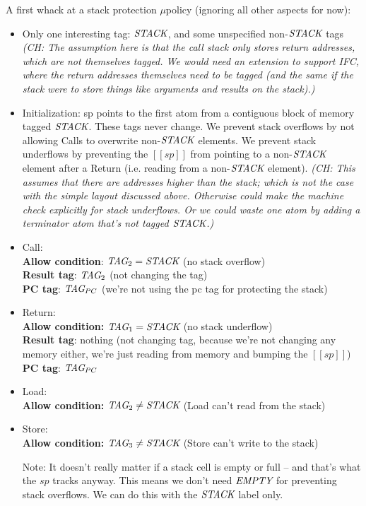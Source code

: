 \documentclass{article}
\newcommand{\ch}[1]{{\color{dkblue}\em (CH: #1)}}
\newcommand{\micro}{$\mu$}
\newcommand{\uP}{\micro policy\xspace}
\begin{document}
A first whack at a stack protection \uP
(ignoring all other aspects for now):
\begin{itemize}
\item Only one interesting tag: $\textit{STACK}$,
  and some unspecified non-$\textit{STACK}$ tags
  \ch{The assumption here is that the call stack only stores return
    addresses, which are not themselves tagged. We would need an
    extension to support IFC, where the return addresses themselves
    need to be tagged (and the same if the stack were to store things
    like arguments and results on the stack).}
\item Initialization: sp points to the first atom from a contiguous
  block of memory tagged $\textit{STACK}$.
  These tags never change. We prevent stack overflows by not
  allowing Calls to overwrite non-$\textit{STACK}$ elements. We prevent stack
  underflows by preventing the $[[sp]]$ from pointing to a non-$\textit{STACK}$
  element after a Return (i.e. reading from a non-$\textit{STACK}$ element).
  \ch{This assumes that there are addresses higher than the stack;
    which is not the case with the simple layout discussed above.
    Otherwise could make the machine check explicitly for stack
    underflows. Or we could waste one atom by adding a terminator atom
    that's not tagged $\textit{STACK}$.}
\item Call:\\
{\bf Allow condition}:
    $\textit{TAG}_{2} = \textit{STACK}$
(no stack overflow)\\
{\bf Result tag}: $\textit{TAG}_{2}$ (not changing the tag)\\
{\bf PC tag}: $\textit{TAG}_{PC}$
(we're not using the pc tag for protecting the stack)

\item Return:\\
{\bf Allow condition:} $\textit{TAG}_{1} = \textit{STACK}$
(no stack underflow)\\
{\bf Result tag}: nothing
(not changing tag, because we're not changing any memory either,
 we're just reading from memory and bumping the $[[sp]]$)\\
{\bf PC tag}: $\textit{TAG}_{PC}$

\item Load:\\
{\bf Allow condition:} $\textit{TAG}_{2} \not= \textit{STACK}$
(Load can't read from the stack)

\item Store:\\
{\bf Allow condition:} $\textit{TAG}_{3} \not= \textit{STACK}$
(Store can't write to the stack)

Note: It doesn't really matter if a stack cell is empty or full
-- and that's what the $sp$ tracks anyway.
This means we don't need $\textit{EMPTY}$ for preventing stack overflows.
We can do this with the $\textit{STACK}$ label only.

\end{itemize}
\end{document}
